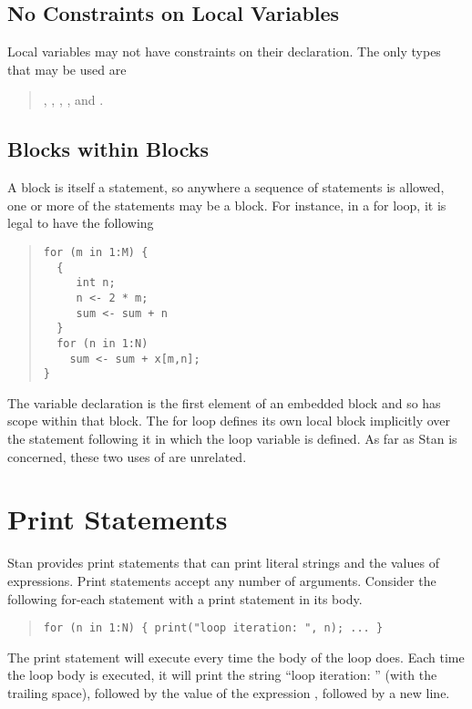 \subsection{No Constraints on Local Variables}

Local variables may not have constraints on their declaration.  The
only types that may be used are
%
\begin{quote}
, , 
, , and .
\end{quote}

\subsection{Blocks within Blocks}

A block is itself a statement, so anywhere a sequence of statements is
allowed, one or more of the statements may be a block.  For instance,
in a for loop, it is legal to have the following
%
\begin{quote}
\begin{Verbatim}
for (m in 1:M) {
  { 
     int n;  
     n <- 2 * m; 
     sum <- sum + n 
  }
  for (n in 1:N) 
    sum <- sum + x[m,n];
}
\end{Verbatim}
\end{quote}
%
The variable declaration  is the first element of an
embedded block and so has scope within that block.  The for loop
defines its own local block implicitly over the statement following it
in which the loop variable is defined.  As far as Stan is concerned,
these two uses of  are unrelated.  

\section{Print Statements}\label{print-statements.section}

Stan provides print statements that can print literal strings and the
values of expressions.  Print statements accept any number of
arguments.  Consider the following for-each statement with a print
statement in its body.
%
\begin{quote}
\begin{Verbatim}
for (n in 1:N) { print("loop iteration: ", n); ... }
\end{Verbatim}
\end{quote}
%
The print statement will execute every time the body of the loop does.
Each time the loop body is executed, it will print the string ``loop iteration:
'' (with the trailing space), followed by the value of the expression
, followed by a new line.

